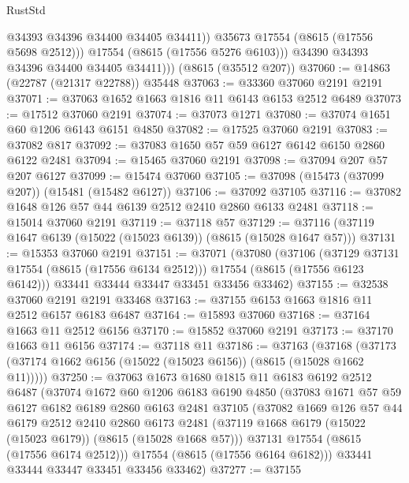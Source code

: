 \begin{lexlean}{RustStd}
\begin{coremodule}
                  @34393
                  @34396
                  @34400
                  @34405
                  @34411))
              @35673
              @17554
              (@8615 (@17556 @5698 @2512)))
            @17554
            (@8615 (@17556 @5276 @6103)))
          @34390
          @34393
          @34396
          @34400
          @34405
          @34411)))
    (@8615 (@35512 @207))
@37060 := @14863 (@22787 (@21317 @22788)) @35448
@37063 := @33360 @37060 @2191 @2191
@37071 := @37063 @1652 @1663 @1816 @11 @6143 @6153 @2512 @6489
@37073 := @17512 @37060 @2191
@37074 := @37073 @1271
@37080 := @37074 @1651 @60 @1206 @6143 @6151 @4850
@37082 := @17525 @37060 @2191
@37083 := @37082 @817
@37092 := @37083 @1650 @57 @59 @6127 @6142 @6150 @2860 @6122 @2481
@37094 := @15465 @37060 @2191
@37098 := @37094 @207 @57 @207 @6127
@37099 := @15474 @37060
@37105 := @37098 (@15473 (@37099 @207)) (@15481 (@15482 @6127))
@37106 := @37092 @37105
@37116 := @37082 @1648 @126 @57 @44 @6139 @2512 @2410 @2860 @6133 @2481
@37118 := @15014 @37060 @2191
@37119 := @37118 @57
@37129 := @37116 (@37119 @1647 @6139 (@15022 (@15023 @6139)) (@8615 (@15028 @1647 @57)))
@37131 := @15353 @37060 @2191
@37151 := @37071
    (@37080
      (@37106
        (@37129 @37131 @17554 (@8615 (@17556 @6134 @2512)))
        @17554
        (@8615 (@17556 @6123 @6142)))
      @33441
      @33444
      @33447
      @33451
      @33456
      @33462)
@37155 := @32538 @37060 @2191 @2191 @33468
@37163 := @37155 @6153 @1663 @1816 @11 @2512 @6157 @6183 @6487
@37164 := @15893 @37060
@37168 := @37164 @1663 @11 @2512 @6156
@37170 := @15852 @37060 @2191
@37173 := @37170 @1663 @11 @6156
@37174 := @37118 @11
@37186 := @37163
    (@37168 (@37173 (@37174 @1662 @6156 (@15022 (@15023 @6156)) (@8615 (@15028 @1662 @11)))))
@37250 := @37063
    @1673
    @1680
    @1815
    @11
    @6183
    @6192
    @2512
    @6487
    (@37074
      @1672
      @60
      @1206
      @6183
      @6190
      @4850
      (@37083
        @1671
        @57
        @59
        @6127
        @6182
        @6189
        @2860
        @6163
        @2481
        @37105
        (@37082
          @1669
          @126
          @57
          @44
          @6179
          @2512
          @2410
          @2860
          @6173
          @2481
          (@37119 @1668 @6179 (@15022 (@15023 @6179)) (@8615 (@15028 @1668 @57)))
          @37131
          @17554
          (@8615 (@17556 @6174 @2512)))
        @17554
        (@8615 (@17556 @6164 @6182)))
      @33441
      @33444
      @33447
      @33451
      @33456
      @33462)
@37277 := @37155

\end{coremodule}
\end{lexlean}

